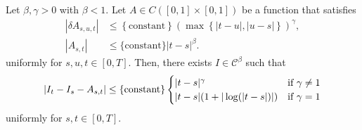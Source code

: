 \begin{theorem}
  Let \( \beta, \gamma > 0 \) with \( \beta < 1 \). Let \( A \in C([0,1] \times [0,1]) \) be a function that satisfies 
  \begin{align*}
    |\delta A_{s,u,t}| &\leq \left\{ \mathrm{constant} \right\} (\max\left\{  |t-u|, |u-s|\right\})^\gamma,\\
    |A_{s,t}| &\leq \{ \mathrm{constant} \} |t-s|^\beta.
  \end{align*}
  uniformly for \( s,u,t \in [0,T] \). Then, there exists \( I \in \mathcal{C}^\beta \) such that 
  \begin{align*}
    |I_t - I_s -A_{s,t}| \leq \left\{ \mathrm{constant} \right\} \begin{cases}
      |t-s|^\gamma \quad & \text{if \( \gamma \neq 1 \)}\\
      |t-s|(1 + |\log(|t - s|)|) &\text{if \( \gamma = 1 \)}
    \end{cases}
  \end{align*}
  uniformly for \( s,t \in [0,T] \).
\end{theorem}